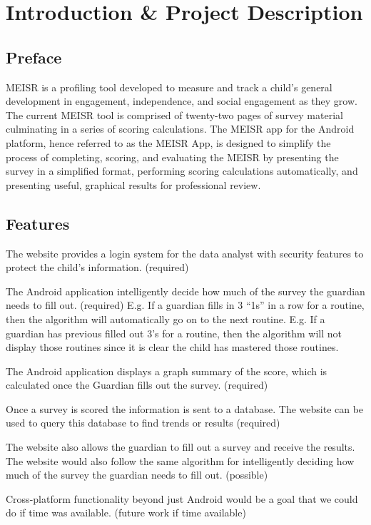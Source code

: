 \chapter{Introduction \& Project Description}
\label{ch:intro}

\section{Preface}
MEISR is a profiling tool developed to measure and track a child’s general development in engagement, independence, and social engagement as they grow. The current MEISR tool is comprised of twenty-two pages of survey material culminating in a series of scoring calculations. The MEISR app for the Android platform, hence referred to as the MEISR App, is designed to simplify the process of completing, scoring, and evaluating the MEISR by presenting the survey in a simplified format, performing scoring calculations automatically, and presenting useful, graphical results for professional review.

\section{Features}
	
The website provides a login system for the data analyst with security features to protect the child’s information. (required)

The Android application intelligently decide how much of the survey the guardian needs to fill out. (required)
E.g. If a guardian fills in 3 “1s” in a row for a routine, then the algorithm will automatically go on to the next routine.
E.g. If a guardian has previous filled out 3’s for a routine, then the algorithm will not display those routines since it is clear the child has mastered those routines.

The Android application displays a graph summary of the score, which is calculated once the Guardian fills out the survey. (required)

Once a survey is scored the information is sent to a database. The website can be used to query this database to find trends or results (required)

The website also allows the guardian to fill out a survey and receive the results. The website would also follow the same algorithm for intelligently deciding how much of the survey the guardian needs to fill out. (possible)

Cross-platform functionality beyond just Android would be a goal that we could do if time was available. (future work if time available)

